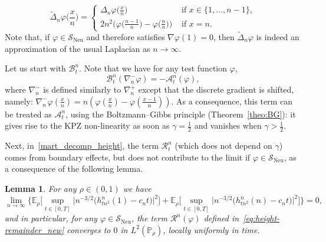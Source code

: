 \documentclass[10pt]{amsart}
\newtheorem{lemm}[theo]{Lemma}\newtheorem{prop}[theo]{Proposition}\newtheorem{coro}[theo]{Corollary}\newtheorem{conj}[theo]{Conjecture}
\theoremstyle{definition}\newtheorem{defi}[theo]{Definition}\newtheorem{rema}[theo]{Remark}\newtheorem{exam}[theo]{Example}\newtheorem{exem}[theo]{Example}\newtheorem{nota}[theo]{Notation}
\DeclareMathOperator{\Neu}{Neu}
\newcommand{\bb}[1]{{\mathbb #1}}
\newcommand{\mc}[1]{{\mathcal #1}}
\renewcommand{\mc}[1]{{\mathcal #1}}
\newcommand{\SN}{\ensuremath{\mc S_{\Neu}}}
\renewcommand{\tilde}{\widetilde}
\renewcommand{\tfrac}{\frac}
\begin{document}
\begin{equation}\label{eq:lap2}
\tilde\Delta_n\varphi\big(\tfrac x n\big) =
\begin{cases}
\Delta_n\varphi \big(\tfrac x n\big) & \text{ if } x \in \{1,\dots,n-1\},\\[0.3em]
2 n^2\big(\varphi\big(\tfrac{n-1}{n}\big)-\varphi\big(\tfrac{n}{n}\big)\big) & \text{ if }x=n.
\end{cases}
\end{equation}
Note that, if $\varphi \in \SN$ and therefore satisfies $\nabla \varphi(1)=0$, then $\tilde\Delta_n\varphi$ is indeed an approximation of the usual Laplacian as $n\to\infty$.

Let us start with $\mc B_t^n$. Note that we have for any test function $\varphi$,
\[
\mc B_t^n(\nabla_n^- \varphi) = -\mc A_t^n(\varphi),
\]
where $\nabla_n^-$ is defined similarly to $\nabla_n^+$ except that the discrete gradient is shifted, namely: $ \nabla_n^-\varphi(\frac x n) = n(\varphi(\frac x n)-\varphi(\frac{x-1}{n}))$. As a consequence, this term can be treated as $\mc A_t^n$, using the Boltzmann--Gibbs principle (Theorem~\ref{theo:BG}): it gives rise to the KPZ non-linearity as soon as $\gamma=\frac12$ and vanishes when $\gamma >\frac12$.

Next, in~\eqref{mart_decomp_height}, the term $\mc R_t^n$ (which does not depend on $\gamma$) comes from boundary effects, but does not contribute to the limit if $\varphi \in \SN$, as a consequence of the following lemma.

\begin{lemm}\label{lem:height-boundary}
For any $\rho \in (0,1)$ we have
\[
\lim_{n \rightarrow \infty} \bigg\{ \mathbb{E}_\rho \bigg[\sup_{t \in [0,T]} \big| n^{- 3/2} \big(h^n_{{tn^2}} (1) - c_n t\big) \big|^2\bigg] +\mathbb{E}_\rho \bigg[\sup_{t \in [0, T]} \big| n^{- 3/2} \big(h^n_{{tn^2}} (n) - c_n t\big) \big|^2\bigg] \bigg\} = 0,
\]
and in particular, for any $\varphi \in \SN$, the term $\mc R^n(\varphi)$ defined in~\eqref{eq:height-remainder_new} converges to $0$ in $L^2(\bb P_\rho)$, locally uniformly in time.
\end{lemm}
\end{document}
